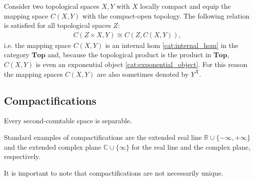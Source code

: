     \begin{property}\label{topology:internal_hom}
        Consider two topological spaces $X,Y$ with $X$ locally compact and equip the mapping space $C(X,Y)$ with the compact-open topology. The following relation is satisfied for all topological spaces $Z$:
        \begin{gather}
            C(Z\times X,Y)\cong C(Z,C(X,Y)),
        \end{gather}
        i.e. the mapping space $C(X,Y)$ is an internal hom \ref{cat:internal_hom} in the category $\mathbf{Top}$ and, because the topological product is the product in $\mathbf{Top}$, $C(X,Y)$ is even an exponential object \ref{cat:exponential_object}. For this reason the mapping spaces $C(X,Y)$ are also sometimes denoted by $Y^X$.
    \end{property}

\subsection{Compactifications}

    \begin{property}
        Every second-countable space is separable.
    \end{property}


    \begin{example}
        Standard examples of compactifications are the extended real line $\mathbb{R}\cup\{-\infty,+\infty\}$ and the extended complex plane $\mathbb{C}\cup\{\infty\}$ for the real line and the complex plane, respectively.
    \end{example}
    \begin{remark*}
        It is important to note that compactifications are not necessarily unique.
    \end{remark*}

